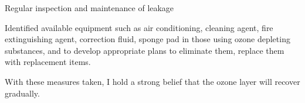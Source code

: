 \documentclass[12pt]{article}
\begin{document}
Regular inspection and maintenance of leakage

Identified available equipment such as air conditioning, cleaning agent, fire extinguishing agent, correction fluid, sponge pad in those using ozone depleting substances, and to develop appropriate plans to eliminate them, replace them with replacement items.

With these measures taken, I hold a strong belief that the ozone layer will recover gradually.




\newpage
\end{document}
